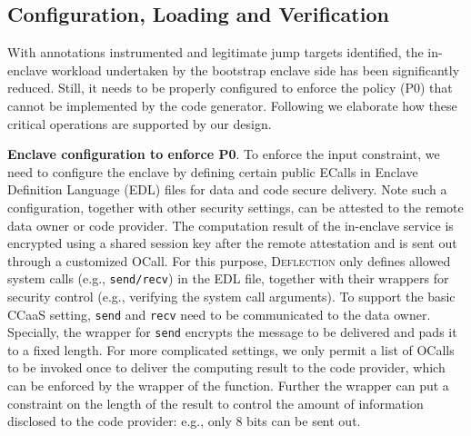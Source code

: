 

\subsection{Configuration, Loading and Verification}
\label{subsec:verify}

With annotations instrumented and legitimate jump targets identified, the in-enclave workload undertaken by the bootstrap enclave side has been significantly reduced. Still, it needs to be properly configured to enforce the policy (P0) that cannot be implemented by the code generator.
Following we elaborate how these critical operations are supported by our design.   



\vspace{3pt}\noindent\textbf{Enclave configuration to enforce P0}. 
To enforce the input constraint, we need to configure the enclave by defining certain public ECalls in Enclave Definition Language (EDL) files for data and code secure delivery. Note such a configuration, together with other security settings, can be attested to the remote data owner or code provider. The computation result of the in-enclave service is encrypted using a shared session key after the remote attestation and is sent out through a customized OCall. For this purpose, \textsc{Deflection} only defines allowed system calls (e.g., \texttt{send/recv}) in the EDL file, together with their wrappers for security control (e.g., verifying the system call arguments).
To support the basic CCaaS setting,  \texttt{send} and \texttt{recv} need to be communicated to the data owner.  
Specially, the wrapper for \texttt{send} encrypts the message to be delivered and pads it to a fixed length. For more complicated settings, we only permit a list of OCalls to be invoked once to deliver the computing result to the code provider, which can be enforced by the wrapper of the function. Further the wrapper can put a constraint on the length of the result to control the amount of information disclosed to the code provider: e.g., only 8 bits can be sent out. 

